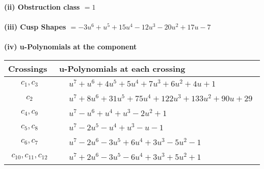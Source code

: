 \documentclass[1p]{elsarticle_modified}
\theoremstyle{definition}
\begin{document}
\flushleft \textbf{(ii) Obstruction class $= 1$}\\~\\
\flushleft \textbf{(iii) Cusp Shapes $= -3 u^6+u^5+15 u^4-12 u^3-20 u^2+17 u-7$}\\~\\
\newpage\renewcommand{\arraystretch}{1}
\flushleft \textbf{(iv) u-Polynomials at the component}\newline \\
\begin{tabular}{m{50pt}|m{274pt}}
Crossings & \hspace{64pt}u-Polynomials at each crossing \\
\hline $$\begin{aligned}c_{1},c_{3}\end{aligned}$$&$\begin{aligned}
&u^7+u^6+4 u^5+5 u^4+7 u^3+6 u^2+4 u+1
\end{aligned}$\\
\hline $$\begin{aligned}c_{2}\end{aligned}$$&$\begin{aligned}
&u^7+8 u^6+31 u^5+75 u^4+122 u^3+133 u^2+90 u+29
\end{aligned}$\\
\hline $$\begin{aligned}c_{4},c_{9}\end{aligned}$$&$\begin{aligned}
&u^7- u^6+u^4+u^3-2 u^2+1
\end{aligned}$\\
\hline $$\begin{aligned}c_{5},c_{8}\end{aligned}$$&$\begin{aligned}
&u^7-2 u^5- u^4+u^3- u-1
\end{aligned}$\\
\hline $$\begin{aligned}c_{6},c_{7}\end{aligned}$$&$\begin{aligned}
&u^7-2 u^6-3 u^5+6 u^4+3 u^3-5 u^2-1
\end{aligned}$\\
\hline $$\begin{aligned}c_{10},c_{11},c_{12}\end{aligned}$$&$\begin{aligned}
&u^7+2 u^6-3 u^5-6 u^4+3 u^3+5 u^2+1
\end{aligned}$\\
\hline
\end{tabular}\\~\\
\end{document}
